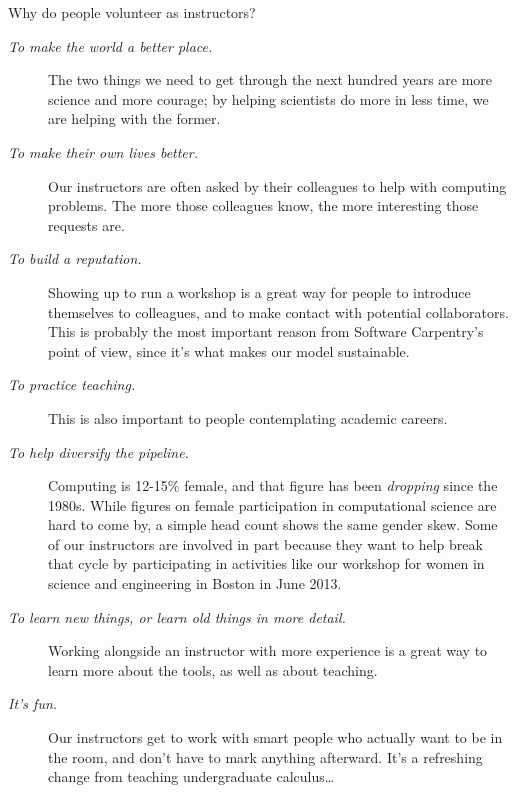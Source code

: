 \documentclass[10pt,a4paper,twocolumn]{article}
\begin{document}
Why do people volunteer as instructors?

\begin{description}

\item[\emph{To make the world a better place.}]  The two things we
  need to get through the next hundred years are more science and more
  courage; by helping scientists do more in less time, we are helping
  with the former.

\item[\emph{To make their own lives better.}]  Our instructors are
  often asked by their colleagues to help with computing problems.
  The more those colleagues know, the more interesting those requests
  are.

\item[\emph{To build a reputation.}]  Showing up to run a workshop is
  a great way for people to introduce themselves to colleagues, and to
  make contact with potential collaborators. This is probably the most
  important reason from Software Carpentry's point of view, since it's
  what makes our model sustainable.

\item[\emph{To practice teaching.}]
  This is also important to people contemplating academic careers.
 
\item[\emph{To help diversify the pipeline.}]  Computing is 12-15\%
  female, and that figure has been \emph{dropping} since the
  1980s. While figures on female participation in computational
  science are hard to come by, a simple head count shows the same
  gender skew. Some of our instructors are involved in part because
  they want to help break that cycle by participating in activities
  like our workshop for women in science and engineering in Boston in
  June 2013.

\item[\emph{To learn new things, or learn old things in more detail.}]
  Working alongside an instructor with more experience is a great way
  to learn more about the tools, as well as about teaching.

\item[\emph{It's fun.}]  Our instructors get to work with smart people
  who actually want to be in the room, and don't have to mark anything
  afterward. It's a refreshing change from teaching undergraduate
  calculus\ldots{}

\end{description}
\end{document}
